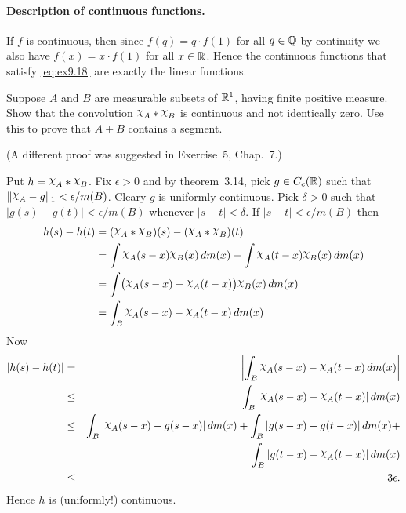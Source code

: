 \begin{enumerate}
\paragraph{Description of continuous functions.}
If $f$ is continuous, then since \(f(q) = q\cdot f(1)\) for all \(q\in\mathbb{Q}\)
by continuity we also have \(f(x) = x\cdot f(1)\) for all \(x\in\mathbb{R}\).
Hence the continuous functions that satisfy \eqref{eq:ex9.18}
are exactly the linear functions.


\begin{excopy}
Suppose $A$ and $B$ are measurable subsets of \(\mathbb{R}^1\), 
having finite positive measure.
Show that the convolution \(\chhi_A \ast \chhi_B\) is continuous 
and not identically zero. Use this to prove that \(A+B\) contains a segment.

(A different proof was suggested in Exercise~5, Chap.~7.)
\end{excopy}

Put \(h = \chhi_A \ast \chhi_B\).
Fix \(\epsilon>0\) and by theorem~3.14, pick \(g\in C_c(\mathbb{R})\)
such that \(\|\chhi_A - g\|_1 < \epsilon/m(B)\).
Cleary $g$ is uniformly continuous.
Pick \(\delta>0\) such that
\(|g(s)-g(t)| < \epsilon/m(B)\) whenever \(|s-t|<\delta\).
If \(|s-t|<\epsilon/m(B)\) then
\begin{align*}
h(s) - h(t)
&= (\chhi_A \ast \chhi_B)(s) - (\chhi_A \ast \chhi_B)(t)  \\
&= \int \chhi_A(s-x)\chhi_B(x)\,dm(x) -
   \int \chhi_A(t-x)\chhi_B(x)\,dm(x) \\
&= \int \bigl(\chhi_A(s-x) - \chhi_A(t-x)\bigr)\chhi_B(x)\,dm(x) \\
&= \int_B \chhi_A(s-x) - \chhi_A(t-x)\,dm(x)
\end{align*}
Now
\begin{eqnarray*}
|h(s) - h(t)|
&=& \left| \int_B \chhi_A(s-x) - \chhi_A(t-x)\,dm(x) \right| \\
&\leq& \int_B |\chhi_A(s-x) - \chhi_A(t-x)|\,dm(x) \\
&\leq& 
   \int_B |\chhi_A(s-x) - g(s-x)|\,dm(x) +
   \int_B |g(s-x) - g(t-x)|\,dm(x) + \\
&& \int_B |g(t-x) - \chhi_A(t-x)|\,dm(x) \\
&\leq& 3\epsilon.
\end{eqnarray*}
Hence $h$ is (uniformly!) continuous.

\end{enumerate}
